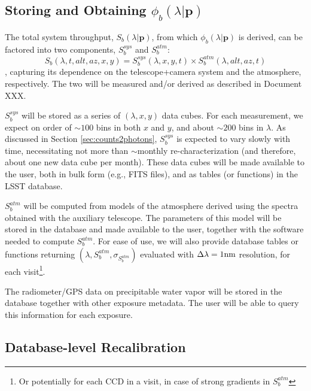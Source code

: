 \documentclass[12pt,preprint]{aastex}
\begin{document}
\subsection{Storing and Obtaining $\phi_b(\lambda|\mathbf{p})$}

The total system throughput, $S_b(\lambda | \mathbf{p})$, from which $\phi_b(\lambda | \mathbf{p})$ is derived, can be factored into two components, $S_b^{sys}$ and $S_b^{atm}$:
%
\begin{equation}
    S_b(\lambda, t, alt, az, x, y) = S_b^{sys}(\lambda, x, y, t) \times S_b^{atm}(\lambda, alt, az, t)
\end{equation}
%
, capturing its dependence on the telescope+camera system and the atmosphere, respectively. The two will be measured and/or derived as described in Document XXX.

$S_b^{sys}$ will be stored as a series of $(\lambda, x, y)$ data cubes. For each measurement, we expect on order of $\sim 100$ bins in both $x$ and $y$, and about $\sim 200$ bins in $\lambda$. As discussed in Section \ref{sec:counts2photons}, $S_b^{sys}$ is expected to vary slowly with time, necessitating not more than $\sim$monthly re-characterization (and therefore, about one new data cube per month). These data cubes will be made available to the user, both in bulk form (e.g., FITS files), and as tables (or functions) in the LSST database.

$S_b^{atm}$ will be computed from models of the atmosphere derived using the spectra obtained with the auxiliary telescope. The parameters of this model will be stored in the database and made available to the user, together with the software needed to compute $S_b^{atm}$. For ease of use, we will also provide database tables or functions returning $(\lambda, S_b^{atm}, \sigma_{S_b^{atm}})$ evaluated with $\Delta\lambda = 1 {\rm nm}$ resolution, for each visit\footnote{Or potentially for each CCD in a visit, in case of strong gradients in $S_b^{atm}$}.

The radiometer/GPS data on precipitable water vapor will be stored in the database together with other exposure metadata. The user will be able to query this information for each exposure.

\subsection{Database-level Recalibration}
\end{document}
